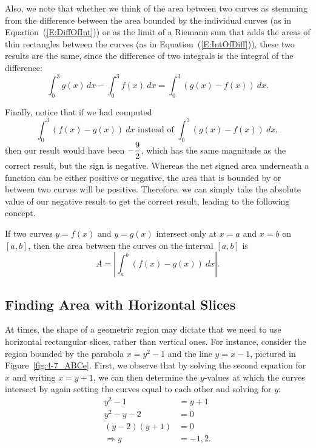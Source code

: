 Also, we note that whether we think of the area between two curves as stemming from the difference between the area bounded by the individual curves (as in Equation~(\ref{E:DiffOfInt})) or as the limit of a Riemann sum that adds the areas of thin rectangles between the curves (as in Equation~(\ref{E:IntOfDiff})), these two results are the same, since the difference of two integrals is the integral of the difference:
\[ \int_0^3 g(x) \, dx -  \int_0^3 f(x) \ dx = \int_0^3 (g(x) - f(x)) \ dx. \]

Finally, notice that if we had computed
\[ \int_0^3 (f(x) - g(x)) \ dx \mbox{ instead of } \int_0^3 (g(x) - f(x)) \ dx, \]
then our result would have been $\displaystyle -\frac{9}{2}$, which has the same magnitude as the correct result, but the sign is negative.  Whereas the net signed area underneath a function can be either positive or negative, the area that is bounded by or between two curves will be positive.  Therefore, we can simply take the absolute value of our negative result to get the correct result, leading to the following concept.

{If two curves $y = f(x)$ and $y = g(x)$ intersect only at $x=a$ and $x=b$ on $[a,b]$, then the area between the curves on the interval $[a,b]$ is 
\[ A = \left| \int_a^b (f(x) - g(x)) \ dx \right|. \]
} %



\subsection*{Finding Area with Horizontal Slices}

At times, the shape of a geometric region may dictate that we need to use horizontal rectangular slices, rather than vertical ones.  For instance, consider the region bounded by the parabola $x = y^2 - 1$ and the line $y = x-1$, pictured in Figure~\ref{fig:4-7_ABCe}.  First, we observe that by solving the second equation for $x$ and writing $x = y + 1$, we can then determine the $y$-values at which the curves intersect by again setting the curves equal to each other and solving for $y$:
\begin{align*}
y^2 - 1 & = y+1 \\
y^2 - y - 2 &= 0 \\
(y-2)(y+1) &= 0 \\
\Rightarrow y &= -1,2.
\end{align*}

